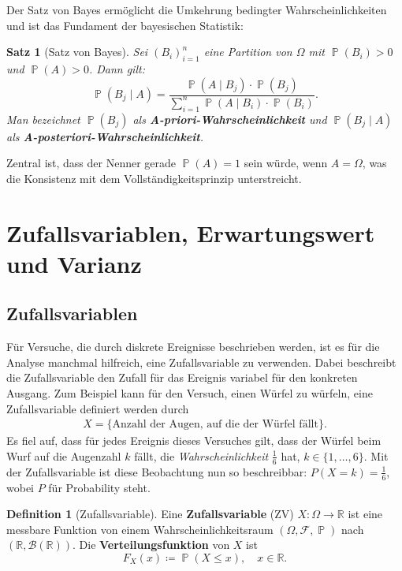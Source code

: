 ﻿\documentclass[12pt,a4paper]{article}
\theoremstyle{definition}
\newtheorem{definition}{Definition}[section]
\theoremstyle{plain}
\newtheorem{satz}{Satz}[section]
\theoremstyle{remark}
\DeclareMathOperator{\Prob}{\mathbb{P}}
\begin{document}
Der Satz von Bayes ermöglicht die Umkehrung bedingter Wahrscheinlichkeiten
und ist das Fundament der bayesischen Statistik:

\begin{satz}[Satz von Bayes]\label{satz:bayes}
  Sei $(B_i)_{i=1}^{n}$ eine Partition von $\Omega$ mit $\Prob(B_i) > 0$ und
  $\Prob(A) > 0$. Dann gilt:
  \[
    \Prob(B_j \mid A)
    = \frac{\Prob(A \mid B_j) \cdot \Prob(B_j)}{\sum_{i=1}^{n} \Prob(A \mid B_i) \cdot \Prob(B_i)}.
  \]
  Man bezeichnet $\Prob(B_j)$ als \textbf{A-priori-Wahr\-schein\-lich\-keit} und
  $\Prob(B_j \mid A)$ als \textbf{A-pos\-te\-rio\-ri-Wahr\-schein\-lich\-keit}.
\end{satz}

Zentral ist, dass der Nenner gerade $\Prob(A) = 1$ sein würde, wenn $A = \Omega$,
was die Konsistenz mit dem Vollständigkeitsprinzip unterstreicht.

\section{Zufallsvariablen, Erwartungswert und Varianz}
\label{sec:erwartungswert}

\subsection{Zufallsvariablen}

Für Versuche, die durch diskrete Ereignisse beschrieben werden, ist es für
die Analyse manchmal hilfreich, eine Zufallsvariable zu verwenden. Dabei
beschreibt die Zufallsvariable den Zufall für das Ereignis variabel für den
konkreten Ausgang. Zum Beispiel kann für den Versuch, einen Würfel zu würfeln,
eine Zufallsvariable definiert werden durch
\begin{align}
  \label{math:var-x}
  X = \{\text{Anzahl der Augen, auf die der Würfel fällt}\}.
\end{align}
Es fiel auf, dass für jedes Ereignis dieses Versuches gilt, dass der Würfel
beim Wurf auf die Augenzahl $k$ fällt, die \textit{Wahrscheinlichkeit}
$\frac{1}{6}$ hat, $k \in \{1, \ldots, 6\}$. Mit der Zufallsvariable ist
diese Beobachtung nun so beschreibbar: $P(X = k) = \frac{1}{6}$, wobei $P$
für Probability steht.

\begin{definition}[Zufallsvariable]\label{def:zufvar}
  Eine \textbf{Zufallsvariable} (ZV) $X\colon \Omega \to \mathbb{R}$ ist eine
  messbare Funktion von einem Wahrscheinlichkeitsraum $(\Omega,\mathcal{F},\Prob)$
  nach $(\mathbb{R}, \mathcal{B}(\mathbb{R}))$. Die
  \textbf{Verteilungsfunktion} von $X$ ist
  \[
    F_X(x) \coloneqq \Prob(X \leq x), \quad x \in \mathbb{R}.
  \]
\end{definition}
\end{document}
